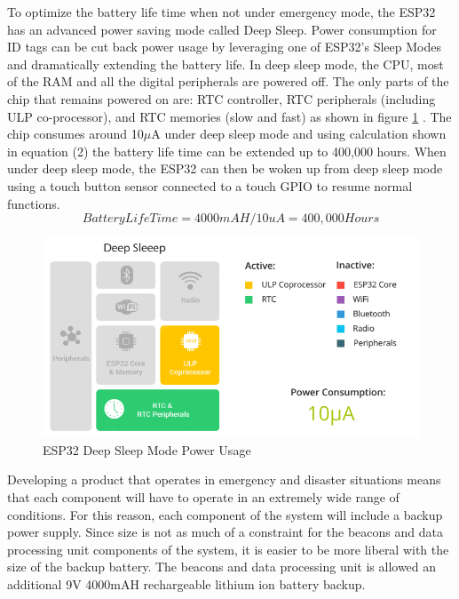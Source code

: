 \pagebreak
To optimize the battery life time when not under emergency mode, the ESP32 has an advanced power saving mode called Deep Sleep. Power consumption for ID tags can be cut back power usage by leveraging one of ESP32’s Sleep Modes and dramatically extending the battery life. In deep sleep mode, the CPU, most of the RAM and all the digital peripherals are powered off. The only parts of the chip that remains powered on are: RTC controller, RTC peripherals (including ULP co-processor), and RTC memories (slow and fast) as shown in figure \ref{ds_mode} \cite{R5-1-1}. The chip consumes around 10\(\mu\)A under deep sleep mode and using calculation shown in equation (2) the battery life time can be extended up to 400,000 hours. When under deep sleep mode, the ESP32 can then be woken up from deep sleep mode using a touch button sensor connected to a touch GPIO to resume normal functions.
\medskip
\begin{equation}
Battery Life Time = 4000mAH/10uA = 400,000 Hours
\end{equation}

\medskip
\begin{figure}[H]
\centering
    \includegraphics[scale=0.7]{./images/ds_mode.png}
    \caption{ESP32 Deep Sleep Mode Power Usage}
    \label{ds_mode}
\end{figure}

\bigskip
Developing a product that operates in emergency and disaster situations means that each component will have to operate in an extremely wide range of conditions. For this reason, each component of the system will include a backup power supply. Since size is not as much of a constraint for the beacons and data processing unit components of the system, it is easier to be more liberal with the size of the backup battery. The beacons and data processing unit is allowed an additional 9V 4000mAH rechargeable lithium ion battery backup. 


